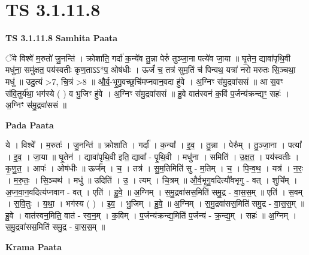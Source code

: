 \documentclass[17pt]{extarticle}
\begin{document}
\section{ TS 3.1.11.8 }

\textbf{TS 3.1.11.8 } \newline
\textbf{Samhita Paata} \newline

ॅये विश्वे॑ म॒रुतो॑ जु॒नन्ति॑ । क्रोशा॑ति॒ गर्दा॑ क॒न्ये॑व तु॒न्ना पेरुं॑ तुञ्जा॒ना पत्ये॑व जा॒या ॥ घृ॒तेन॒ द्यावा॑पृथि॒वी मधु॑ना॒ समु॑क्षत॒ पय॑स्वतीः कृण॒ताऽऽ*प॒ ओष॑धीः । ऊर्जं॑ च॒ तत्र॑ सुम॒तिं च॑ पिन्वथ॒ यत्रा॑ नरो मरुतः सि॒ञ्चथा॒ मधु॑ ॥ उदु॒त्यं >7, चि॒त्रं >8 ॥ औ॒र्व॒-भृ॒गु॒वच्छुचि॑मप्नवान॒वदा हु॑वे । अ॒ग्निꣳ स॑मु॒द्रवा॑ससं ॥ आ स॒वꣳ स॑वि॒तुर्य॑था॒ भग॑स्ये ( ) व भु॒जिꣳ हु॑वे । अ॒ग्निꣳ स॑मु॒द्रवा॑ससं ॥ हु॒वे वात॑स्वनं क॒विं प॒र्जन्य॑क्रन्द्यꣳ॒॒ सहः॑ । अ॒ग्निꣳ स॑मु॒द्रवा॑ससं ॥ \newline

\textbf{Pada Paata} \newline

ये । विश्वे᳚ । म॒रुतः॑ । जु॒नन्ति॑ ॥ क्रोशा॑ति । गर्दा᳚ । क॒न्या᳚ । इ॒व॒ । तु॒न्ना । पेरु᳚म् । तु॒ञ्जा॒ना । पत्या᳚ । इ॒व॒ । जा॒या ॥ घृ॒तेन॑ । द्यावा॑पृथि॒वी इति॒ द्यावा᳚ - पृ॒थि॒वी । मधु॑ना । समिति॑ । उ॒क्ष॒त॒ । पय॑स्वतीः । कृ॒णु॒त॒ । आपः॑ । ओष॑धीः ॥ ऊर्ज᳚म् । च॒ । तत्र॑ । सु॒म॒तिमिति॑ सु - म॒तिम् । च॒ । पि॒न्व॒थ॒ । यत्र॑ । न॒रः॒ । म॒रु॒तः॒ । सि॒ञ्चथ॑ । मधु॑ ॥ उदिति॑ । उ॒ । त्यम् । चि॒त्रम् ॥ औ॒र्व॒भृ॒गु॒वदित्यौ᳚वभृगु - वत् । शुचि᳚म् । अ॒प्न॒वा॒न॒वदित्य॑प्नवान - वत् । एति॑ । हु॒वे॒ ॥ अ॒ग्निम् । स॒मु॒द्रवा॑सस॒मिति॑ समु॒द्र - वा॒स॒स॒म् ॥ एति॑ । स॒वम् । स॒वि॒तुः । य॒था॒ । भग॑स्य ( ) । इ॒व॒ । भु॒जिम् । हु॒वे॒ ॥ अ॒ग्निम् । स॒मु॒द्रवा॑सस॒मिति॑ समु॒द्र - वा॒स॒स॒म् ॥ हु॒वे । वात॑स्वन॒मिति॒ वात॑ - स्व॒न॒म् । क॒विम् । प॒र्जन्य॑क्रन्द्य॒मिति॑ प॒र्जन्य॑ - क्र॒न्द्य॒म् । सहः॑ ॥ अ॒ग्निम् । स॒मु॒द्रवा॑सस॒मिति॑ समु॒द्र - वा॒स॒स॒म् ॥  \newline


\textbf{Krama Paata} \newline
\end{document}
